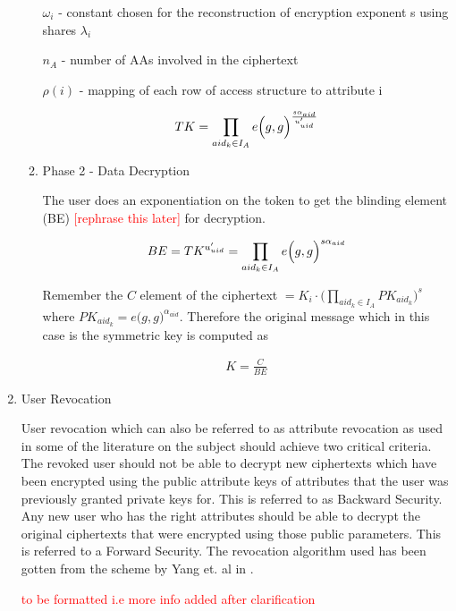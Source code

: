 \begin{enumerate}
\begin{enumerate}
		$\omega_{i}$ - constant chosen for the reconstruction of encryption exponent s using shares $\lambda_{i}$
		
		$n_A$ - number of AAs involved in the ciphertext
		
		$\rho(i)$ - mapping of each row of access structure to attribute i
		
		\begin{align*}
			TK = \prod\limits_{aid_{k} \in I_{A}} e\Bigl(g, g\Bigl)^{\frac{s\alpha_{aid}}{u'_{uid}}}
		\end{align*}
	
	
		\item Phase 2 - Data Decryption
		
		The user does an exponentiation on the token to get the blinding element (BE) \textcolor{red}{[rephrase this later]} for decryption.
		
		\begin{align*}
			BE= TK^{u'_{uid}} = \prod\limits_{aid_{k} \in I_{A}} e\Bigl(g, g\Bigl)^{s\alpha_{aid}}
		\end{align*}
	
		Remember the $C$ element of the ciphertext $= K_i\cdot\bigl(\prod\limits_{aid_{k} \in I_{A}}PK_{aid_{k}}\bigl)^{s}$ where $PK_{aid_{k}} = e\bigl(g, g\bigl)^{\alpha_{aid}}$. Therefore the original message which in this case is the symmetric key is computed as
		
		\begin{align*}
			K = \frac{C}{BE}
		\end{align*}
	\end{enumerate}

	\item User Revocation
	
	User revocation which can also be referred to as attribute revocation as used in some of the literature on the subject should achieve two critical criteria. The revoked user should not be able to decrypt new ciphertexts which have been encrypted using the public attribute keys of attributes that the user was previously granted private keys for. This is referred to as Backward Security. Any new user who has the right attributes should be able to decrypt the original ciphertexts that were encrypted using those public parameters. This is referred to a Forward Security. The revocation algorithm used has been gotten from the scheme by Yang et. al in \cite{Yang2014}.
	
	\textcolor{red}{to be formatted i.e more info added after clarification}
	

\end{enumerate}
